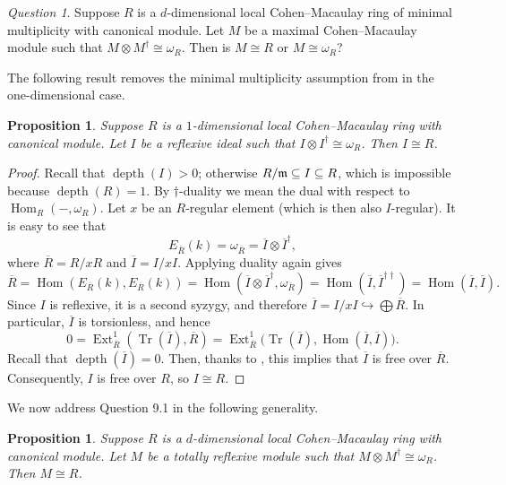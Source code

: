 \documentclass[10. pt,a4paper]{amsart}
\newtheorem{proposition}[theorem]{Proposition}
\theoremstyle{definition}
\theoremstyle{remark}
\newtheorem{question}[theorem]{Question}
\newcommand{\Tr}{\operatorname{Tr}}
\newcommand{\Ext}{\operatorname{Ext}}
\newcommand{\Hom}{\operatorname{Hom}}
\newcommand{\depth}{\operatorname{depth}}
\newcommand{\fm}{\frak{m}}
\begin{document}
\begin{question}
	Suppose $R$ is a $d$-dimensional local Cohen--Macaulay ring of minimal multiplicity with canonical module. Let $M$ be a maximal Cohen--Macaulay module such that $M \otimes M^\dagger \cong \omega_R$. Then is $M \cong R$ or $M \cong \omega_R$?
\end{question}

The following result removes the minimal multiplicity assumption from \cite[Corollary 4.5]{celgo} in the one-dimensional case.

\begin{proposition}
	Suppose $R$ is a $1$-dimensional local Cohen--Macaulay ring with canonical module. Let $I$ be a reflexive ideal such that $I \otimes I^\dagger \cong \omega_R$. Then $I \cong R$.
\end{proposition}

\begin{proof}
	Recall that $\depth(I) > 0$; otherwise $R/\fm \subseteq I \subseteq R$, which is impossible because $\depth(R) = 1$. By $\dagger$-duality we mean the dual with respect to $\Hom_R(-, \omega_R)$. Let $x$ be an $R$-regular element (which is then also $I$-regular). It is easy to see that
	\[
	E_{\overline{R}}(k) = \omega_{\overline{R}} = \overline{I} \otimes \overline{I}^\dagger,
	\]
	where $\overline{R}=R/xR$ and $\overline{I}=I/xI$. Applying duality again gives
	\[
	\overline{R} = \Hom(E_{\overline{R}}(k), E_{\overline{R}}(k)) = \Hom(\overline{I} \otimes \overline{I}^\dagger, \omega_{\overline{R}})
	= \Hom(\overline{I}, \overline{I}^{\dagger\dagger}) = \Hom(\overline{I}, \overline{I}).
	\]
	Since $I$ is reflexive, it is a second syzygy, and therefore $\overline{I} = I/xI \hookrightarrow \bigoplus \overline{R}$. In particular, $\overline{I}$ is torsionless, and hence
	\[
	0 = \Ext^1_{\overline{R}}(\Tr(\overline{I}), \overline{R}) = \Ext^1_{\overline{R}}\bigl(\Tr(\overline{I}), \Hom(\overline{I}, \overline{I})\bigr).
	\]
	Recall that $\depth(\overline{I}) = 0$. Then, thanks to \cite[Proposition 3.3(2)]{ta}, this implies that $\overline{I}$ is free over $\overline{R}$. Consequently, $I$ is free over $R$, so $I \cong R$.
\end{proof}

We now address Question 9.1 in the following  generality.

\begin{proposition}
	Suppose $R$ is a $d$-dimensional local Cohen--Macaulay ring with canonical module. Let $M$ be a totally reflexive module such that $M \otimes M^\dagger \cong \omega_R$. Then $M \cong R$.
\end{proposition}
\end{document}
